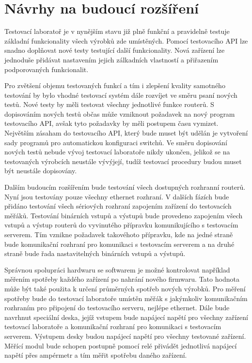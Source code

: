 \chapter{Návrhy na budoucí rozšíření}
Testovací laboratoř je v nynějším stavu již plně funkční a pravidelně testuje základní funkcionality všech výrobků zde umístěných. Pomocí testovacího API lze snadno doplňovat nové testy testující další funkcionality. Nová zařízení lze jednoduše přidávat nastavením jejich zálkadních vlastností a přiřazením podporovaných funkcionalit.

Pro zvětšení objemu testovaných funkcí a tím i zlepšení kvality samotného testování by bylo vhodné testovací systém dále rozvíjet ve směru psaní nových testů. Nové testy by měli testovat všechny jednotlivé funkce routerů. S dopisováním nových testů občas může vzniknout požadavek na nový program testovacího API, avšak tyto požadavky by měli postupem času vymizet. Největším zásaham do testovacího API, který bude muset být udělán je vytvoření sady programů pro automatickou konfiguraci switchů. Ve směru dopisování nových testů nebude vývoj testovací laboratoře nikdy ukončen, jelikož se na testovaných výrobcích neustále vývýjejí, tudíž testovací procedury budou muset být neustále dopisovány.

Dalším budoucím rozšířením bude testování všech dostupných rozhranní routerů. Nyní jsou testovány pouze všechny ethernet rozhraní. V dalších fázích bude přidáno testování všech sériových rozhraní zapojením zařízení do testovacích měřáků. Testování binárních vstupů a výstupů bude provedeno zapojením všech vstupů a výstup routerů do vyvinutého přípravku komunikujícího s testovacím serverem. Tím vznikne požadavek takovéhoto přípravku, kde na jedné straně bude komunikační rozhraní pro komunikaci s testovacím serverem a na druhé straně bude řada nastavitelných binárních vstupů a výstupů.

Správnou spolupráci hardwaru se softwarem je možné kontrolovat například měřením spotřeby každého zařízení po nahrání nového firmwaru. Tato hodnota může být také použita k určení průměrných spotřeb nových výrobků. Pro měření spotřeby bude do testovací laboratoře umístěn měřák s jakýmkoliv komunikačním rozhraním pro připojení do testovacího serveru, nejlépe ethernet. Dále bude navrhnut speciální deska, jejíž vstupem bude napájecí napětí pro všechny zařízení testovací laboratoře a komunikační rozhraní pro komunikaci s testovacím serverem. Výstupem desky budou napájecí napětí pro všechny testované zařízení. Měřící modul bude schopen postupně pomocí relé přivádět jednotlivá napájecí napětí přes ampérmetr a tím měřit spotřebu daného zařízení.

\endinput
